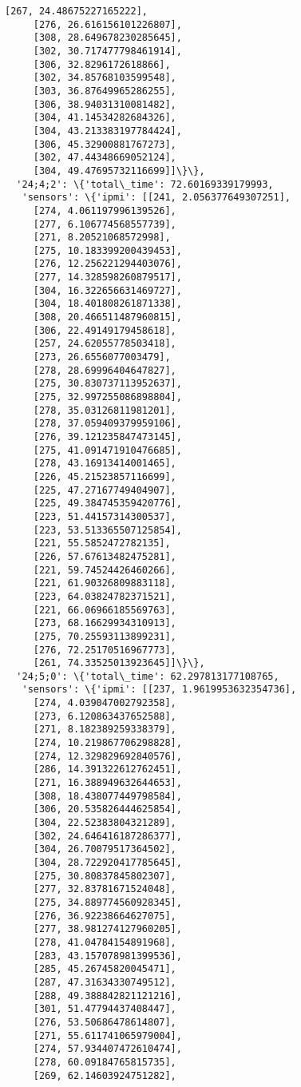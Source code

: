 \documentclass[11pt]{article}
\begin{document}
\begin{tcolorbox}[breakable, size=fbox, boxrule=.5pt, pad at break*=1mm, opacityfill=0]
\begin{Verbatim}[commandchars=\\\{\}]
     [267, 24.48675227165222],
     [276, 26.616156101226807],
     [308, 28.649678230285645],
     [302, 30.717477798461914],
     [306, 32.8296172618866],
     [302, 34.85768103599548],
     [303, 36.87649965286255],
     [306, 38.94031310081482],
     [304, 41.14534282684326],
     [304, 43.213383197784424],
     [306, 45.32900881767273],
     [302, 47.44348669052124],
     [304, 49.47695732116699]]\}\},
  '24;4;2': \{'total\_time': 72.60169339179993,
   'sensors': \{'ipmi': [[241, 2.056377649307251],
     [274, 4.061197996139526],
     [277, 6.106774568557739],
     [271, 8.20521068572998],
     [275, 10.183399200439453],
     [276, 12.256221294403076],
     [277, 14.328598260879517],
     [304, 16.322656631469727],
     [304, 18.401808261871338],
     [308, 20.466511487960815],
     [306, 22.49149179458618],
     [257, 24.62055778503418],
     [273, 26.6556077003479],
     [278, 28.69996404647827],
     [275, 30.830737113952637],
     [275, 32.997255086898804],
     [278, 35.03126811981201],
     [278, 37.059409379959106],
     [276, 39.121235847473145],
     [275, 41.091471910476685],
     [278, 43.16913414001465],
     [226, 45.21523857116699],
     [225, 47.27167749404907],
     [225, 49.384745359420776],
     [223, 51.44157314300537],
     [223, 53.513365507125854],
     [221, 55.5852472782135],
     [226, 57.67613482475281],
     [221, 59.74524426460266],
     [221, 61.90326809883118],
     [223, 64.03824782371521],
     [221, 66.06966185569763],
     [273, 68.16629934310913],
     [275, 70.25593113899231],
     [276, 72.25170516967773],
     [261, 74.33525013923645]]\}\},
  '24;5;0': \{'total\_time': 62.297813177108765,
   'sensors': \{'ipmi': [[237, 1.9619953632354736],
     [274, 4.039047002792358],
     [273, 6.120863437652588],
     [271, 8.182389259338379],
     [274, 10.219867706298828],
     [274, 12.329829692840576],
     [286, 14.391322612762451],
     [271, 16.388949632644653],
     [308, 18.438077449798584],
     [306, 20.535826444625854],
     [304, 22.52383804321289],
     [302, 24.646416187286377],
     [304, 26.70079517364502],
     [304, 28.722920417785645],
     [275, 30.80837845802307],
     [277, 32.83781671524048],
     [275, 34.889774560928345],
     [276, 36.92238664627075],
     [277, 38.981274127960205],
     [278, 41.04784154891968],
     [283, 43.157078981399536],
     [285, 45.26745820045471],
     [287, 47.31634330749512],
     [288, 49.388842821121216],
     [301, 51.47794437408447],
     [276, 53.50686478614807],
     [271, 55.611741065979004],
     [274, 57.934407472610474],
     [278, 60.09184765815735],
     [269, 62.14603924751282],

\end{Verbatim}
\end{tcolorbox}
\end{document}
